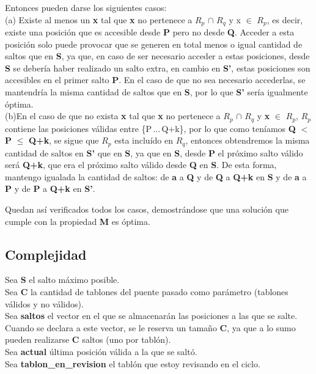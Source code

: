 \documentclass[10pt,a4paper]{article}
\begin{document}
Entonces pueden darse los siguientes casos:\\

(a) Existe al menos un \textbf{x} tal que \textbf{x} no pertenece a $R_{p}$ $\cap$ $R_{q}$ y x $\in$ $R_{p}$, es decir, existe una posición que es accesible desde \textbf{P} pero no desde \textbf{Q}. Acceder a esta posición solo puede provocar que se generen en total menos o igual cantidad de saltos que en \textbf{S}, ya que, en caso de ser necesario acceder a estas posiciones, desde \textbf{S} se debería haber realizado un salto extra, en cambio en \textbf{S'}, estas posiciones son accesibles en el primer salto \textbf{P}.
En el caso de que no sea necesario accederlas, se mantendría la misma cantidad de saltos que en \textbf{S}, por lo que \textbf{S'} sería igualmente óptima.\\

(b)En el caso de que no exista \textbf{x} tal que \textbf{x} no pertenece a $R_{p}$ $\cap$ $R_{q}$ y \textbf{x} $\in$ $R_{p}$, $R_{p}$ contiene las posiciones válidas entre \{P\,...\,Q+k\}, por lo que como teníamos \textbf{Q} $<$ \textbf{P} $\leq$ \textbf{Q+k}, se sigue que $R_{p}$ esta incluído en $R_{q}$, entonces obtendremos la misma cantidad de saltos en \textbf{S'} que en \textbf{S}, ya que en \textbf{S}, desde \textbf{P} el próximo salto válido será \textbf{Q+k}, que era el próximo salto válido desde \textbf{Q} en \textbf{S}. De esta forma, mantengo igualada la cantidad de saltos: de \textbf{a} a \textbf{Q} y de \textbf{Q} a \textbf{Q+k} en \textbf{S} y de \textbf{a} a \textbf{P} y de \textbf{P} a \textbf{Q+k} en \textbf{S'}.

Quedan así verificados todos los casos, demostrándose que una solución que cumple con la propiedad \textbf{M} es óptima.\newpage




\subsection{Complejidad}
\noindent Sea \textbf{S} el salto m\'aximo posible.\\
Sea \textbf{C} la cantidad de tablones del puente pasado como par\'ametro (tablones v\'alidos y no v\'alidos).\\
Sea \textbf{saltos} el vector en el que se almacenar\'an las posiciones a las que se salte. Cuando se declara a este vector, se le reserva un tama\~no \textbf{C}, ya que a lo sumo pueden realizarse \textbf{C} saltos (uno por tabl\'on).\\
Sea \textbf{actual} última posición válida a la que se saltó.\\
Sea \textbf{tablon\_en\_revision} el tabl\'on que estoy revisando en el ciclo.\\
\end{document}
